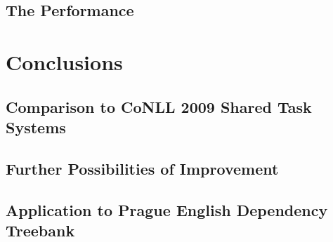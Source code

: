 \documentclass[12pt,notitlepage]{report}
\begin{document}
\section{The Performance}

\chapter{Conclusions}\label{conclusions}
\section{Comparison to CoNLL 2009 Shared Task Systems}
\section{Further Possibilities of Improvement}
\section{Application to Prague English Dependency Treebank}

\cleardoublepage
{}
\printnomenclature[2cm]
\cleardoublepage


\end{document}
